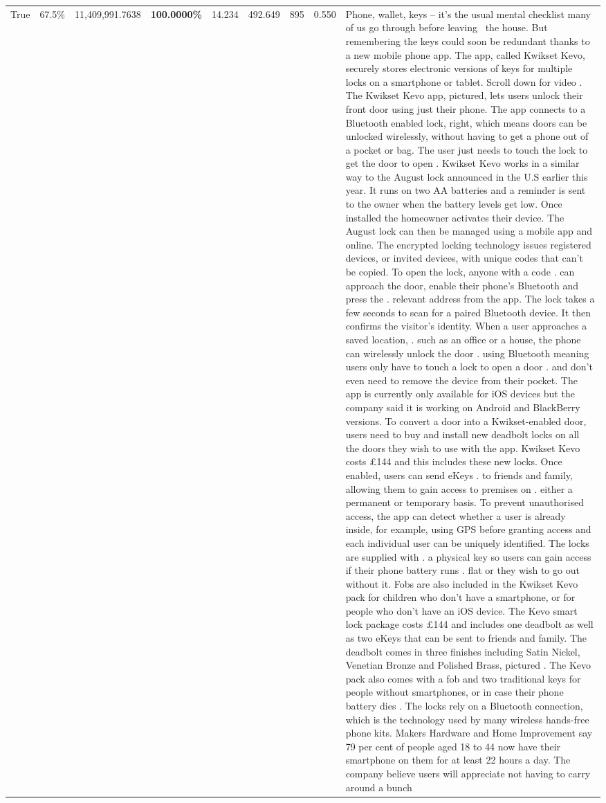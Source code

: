 \begin{table}[H]
\begin{tabular}{lllrlllll}
True & 67.5\% & 11,409,991.7638 & \bfseries \color{red} 100.0000\% & 14.234 & 492.649 & 895 & 0.550 & Phone, wallet, keys – it’s the usual mental checklist many of us go through before leaving  the house. But remembering the keys could soon be redundant thanks to a new mobile phone app. The app, called Kwikset Kevo, securely stores electronic versions of keys for multiple locks on a smartphone or tablet. Scroll down for video . The Kwikset Kevo app, pictured, lets users unlock their front door using just their phone. The app connects to a Bluetooth enabled lock, right, which means doors can be unlocked wirelessly, without having to get a phone out of a pocket or bag. The user just needs to touch the lock to get the door to open . Kwikset Kevo works in a similar way to the August lock announced in the U.S earlier this year. It runs on two AA batteries and a reminder is sent to the owner when the battery levels get low. Once installed the homeowner activates their device. The August lock can then be managed using a mobile app and online. The encrypted locking technology issues registered devices, or invited devices, with unique codes that can't be copied. To open the lock, anyone with a code . can approach the door, enable their phone's Bluetooth and press the . relevant address from the app. The lock takes a few seconds to scan for a paired Bluetooth device. It then confirms the visitor's identity. When a user approaches a saved location, . such as an office or a house, the phone can wirelessly unlock the door . using Bluetooth meaning users only have to touch a lock to open a door . and don't even need to remove the device from their pocket. The app is currently only available for iOS devices but the company said it is working on Android and BlackBerry versions. To convert a door into a Kwikset-enabled door, users need to buy and install new deadbolt locks on all the doors they wish to use with the app. Kwikset Kevo costs £144 and this includes these new locks. Once enabled, users can send eKeys . to friends and family, allowing them to gain access to premises on . either a permanent or temporary basis. To prevent unauthorised access, the app can detect whether a user is already inside, for example, using GPS before granting access and each individual user can be uniquely identified. The locks are supplied with . a physical key so users can gain access if their phone battery runs . flat or they wish to go out without it. Fobs are also included in the Kwikset Kevo pack for children who don't have a smartphone, or for people who don't have an iOS device. The Kevo smart lock package costs £144 and includes one deadbolt as well as two eKeys that can be sent to friends and family. The deadbolt comes in three finishes including Satin Nickel, Venetian Bronze and Polished Brass, pictured . The Kevo pack also comes with a fob and two traditional keys for people without smartphones, or in case their phone battery dies . The locks rely on a Bluetooth connection, which is the technology used by many wireless hands-free phone kits. Makers Hardware and Home Improvement say 79 per cent of people aged 18 to 44 now have their smartphone on them for at least 22 hours a day. The company believe users will appreciate not having to carry around a bunch 
\end{tabular}
\end{table}
